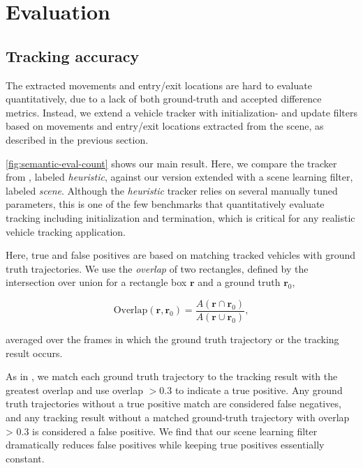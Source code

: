 \section{Evaluation}
\label{sec:semantic-eval}


\subsection{Tracking accuracy}

The extracted movements and entry/exit locations are hard to evaluate quantitatively, due to a lack of both ground-truth and accepted difference metrics.
Instead, we extend a vehicle tracker with initialization- and update filters based on movements and entry/exit locations extracted from the scene, as described in the previous section.



\ref{fig:semantic-eval-count} shows our main result. Here, we compare the tracker from \cite{yanziVehicleTracker}, labeled {\it heuristic}, against our version extended with a scene learning filter, labeled {\it scene}. 
Although the {\it heuristic} tracker relies on several manually tuned parameters, this is one of the few benchmarks that quantitatively evaluate tracking including initialization and termination, which is critical for any realistic vehicle tracking application.

Here, true and false positives are based on matching tracked vehicles with ground truth trajectories.
We use the {\it overlap} of two rectangles, defined by the intersection over union for a rectangle box $\bm{r}$ and a ground truth $\bm{r}_0$,

$$\text{Overlap}(\bm{r}, \bm{r}_0) = \frac{A(\bm{r} \cap \bm{r}_0)}{A(\bm{r} \cup \bm{r}_0)},$$

averaged over the frames in which the ground truth trajectory or the tracking result occurs. 

As in \cite{yanziVehicleTracker}, we match each ground truth trajectory to the tracking result with the greatest overlap and use overlap $> 0.3$ to indicate a true positive. Any ground truth trajectories without a true positive match are considered false negatives, and any tracking result without a matched ground-truth trajectory with overlap > 0.3 is considered a false positive.
We find that our scene learning filter dramatically reduces false positives while keeping true positives essentially constant. 

